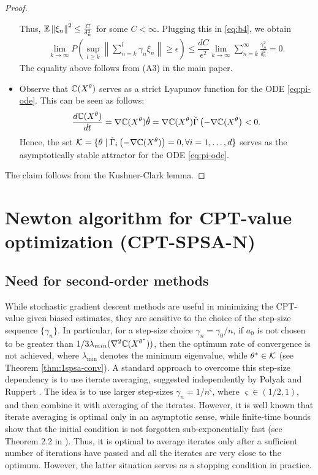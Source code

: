 \begin{proof}
\begin{itemize}
Thus, $\mathbb{E}\left\| \xi_n\right\|^2 \le \frac{C}{\delta_n^2}$ for some $C<\infty$. Plugging this in \eqref{eq:b4}, we obtain
\begin{align*}
 \lim_{k\rightarrow\infty} P\left( \sup_{l\geq k}   \left\|\sum_{n=k}^{l} \gamma_n \xi_n\right\|\geq \epsilon \right) \le \dfrac{d C}{\epsilon^2} \lim_{k\rightarrow\infty} \sum_{n=k}^{\infty}  \frac{\gamma_n^2}{\delta_n^2} =0.
\end{align*}
The equality above follows from (A3) in the main paper.
\item Observe that $\mathbb{C}(X^{\theta})$ serves as a strict Lyapunov function for the ODE \eqref{eq:pi-ode}. This can be seen as follows:
$$ \dfrac{d \mathbb{C}(X^{\theta})}{dt} = \nabla \mathbb{C}(X^{\theta}) \dot \theta = \nabla \mathbb{C}(X^{\theta}) \check\Gamma \left(-\nabla \mathbb{C}(X^{\theta}\right) < 0.$$
Hence, the set $\mathcal{K} = \{\theta \mid \check\Gamma_{i} \left(-\nabla \mathbb{C}(X^{\theta})\right)=0, \forall i=1,\ldots,d\}$ serves as the asymptotically stable attractor for the ODE \eqref{eq:pi-ode}.
\end{itemize} 
The claim follows from the Kushner-Clark lemma.
\end{proof}
\section{Newton algorithm for CPT-value optimization (CPT-SPSA-N)}
\label{sec:2spsa}
\subsection{Need for second-order methods}
While stochastic gradient descent methods are useful in minimizing the CPT-value given biased estimates, they are sensitive to the choice of the step-size sequence $\{\gamma_n\}$.  In particular, for a step-size choice $\gamma_n = \gamma_0/n$, if $a_0$ is not chosen to be greater than $1/3 \lambda_{min}(\nabla^2 \mathbb{C}(X^{\theta^*}))$, then the optimum rate of convergence is not achieved, where $\lambda_{\min}$ denotes the minimum eigenvalue, while $\theta^*\in \mathcal{K}$ (see Theorem \ref{thm:1spsa-conv}). A standard approach to overcome this step-size dependency is to use iterate averaging, suggested independently by Polyak \cite{polyak1992acceleration} and Ruppert \cite{ruppert1991stochastic}. The idea is to use larger step-sizes $\gamma_n = 1/n^\varsigma$, where $\varsigma \in (1/2,1)$, and then combine it with averaging of the iterates. However, it is well known  that iterate averaging is optimal only in an asymptotic sense, while finite-time bounds show that the initial condition is not forgotten sub-exponentially fast (see 
Theorem 2.2 in \cite{fathi2013transport}). Thus, it is optimal to average iterates only 
after a sufficient number of iterations have passed and all the iterates are very close to the optimum. However, the latter situation serves as a stopping condition in practice.

